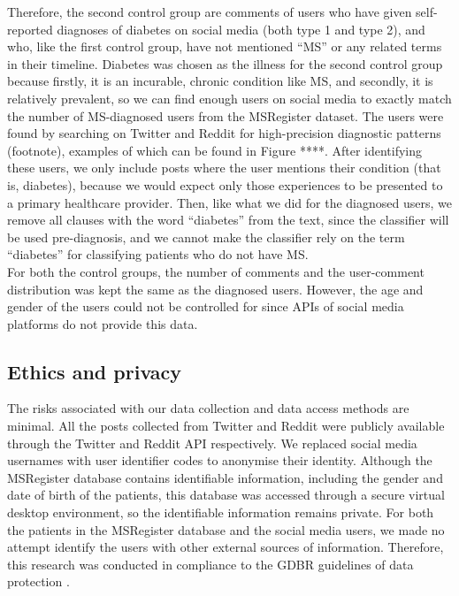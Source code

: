 \documentclass[11pt,a4paper]{article}
\begin{document}
\indent Therefore, the second control group are comments of users who have given self-reported diagnoses of diabetes on social media (both type 1 and type 2), and who, like the first control group, have not mentioned “MS” or any related terms in their timeline. Diabetes was chosen as the illness for the second control group because firstly, it is an incurable, chronic condition like MS, and secondly, it is relatively prevalent, so we can find enough users on social media to exactly match the number of MS-diagnosed users from the MSRegister dataset. The users were found by searching on Twitter and Reddit for high-precision diagnostic patterns (footnote), examples of which can be found in Figure ****. After identifying these users, we only include posts where the user mentions their condition (that is, diabetes), because we would expect only those experiences to be presented to a primary healthcare provider. Then, like what we did for the diagnosed users, we remove all clauses with the word “diabetes” from the text, since the classifier will be used pre-diagnosis, and we cannot make the classifier rely on the term “diabetes” for classifying patients who do not have MS. \\
\indent For both the control groups, the number of comments and the user-comment distribution was kept the same as the diagnosed users. However, the age and gender of the users could not be controlled for since APIs of social media platforms do not provide this data.
\subsection{Ethics and privacy}
The risks associated with our data collection and data access methods are minimal. All the posts collected from Twitter and Reddit were publicly available through the Twitter and Reddit API respectively. We replaced social media usernames with user identifier codes to anonymise their identity. Although the MSRegister database contains identifiable information, including the gender and date of birth of the patients, this database was accessed through a secure virtual desktop environment, so the identifiable information remains private. For both the patients in the MSRegister database and the social media users, we made no attempt identify the users with other external sources of information. Therefore, this research was conducted in compliance to the GDBR guidelines of data protection \citep{GDBR:16}.
\end{document}
